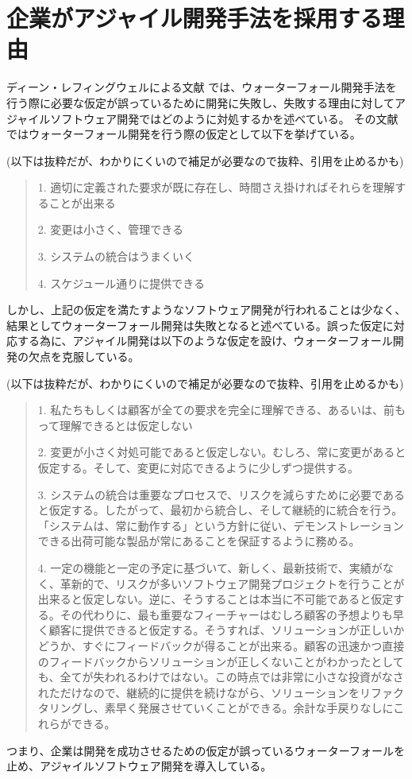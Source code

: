 \section{企業がアジャイル開発手法を採用する理由}

ディーン・レフィングウェルによる文献 \cite{leffingwell2010アジャイル開発の本質とスケールアップ}では、ウォーターフォール開発手法を行う際に必要な仮定が誤っているために開発に失敗し、失敗する理由に対してアジャイルソフトウェア開発ではどのように対処するかを述べている。
その文献ではウォーターフォール開発を行う際の仮定として以下を挙げている。

(以下は抜粋だが、わかりにくいので補足が必要なので抜粋、引用を止めるかも)

\begin{quote}
  1. 適切に定義された要求が既に存在し、時間さえ掛ければそれらを理解することが出来る

  2. 変更は小さく、管理できる

  3. システムの統合はうまくいく

  4. スケジュール通りに提供できる
\end{quote}

しかし、上記の仮定を満たすようなソフトウェア開発が行われることは少なく、結果としてウォーターフォール開発は失敗となると述べている。誤った仮定に対応する為に、アジャイル開発は以下のような仮定を設け、ウォーターフォール開発の欠点を克服している。

(以下は抜粋だが、わかりにくいので補足が必要なので抜粋、引用を止めるかも)

\begin{quote}
  1. 私たちもしくは顧客が全ての要求を完全に理解できる、あるいは、前もって理解できるとは仮定しない

  2. 変更が小さく対処可能であると仮定しない。むしろ、常に変更があると仮定する。そして、変更に対応できるように少しずつ提供する。

  3. システムの統合は重要なプロセスで、リスクを減らすために必要であると仮定する。したがって、最初から統合し、そして継続的に統合を行う。「システムは、常に動作する」という方針に従い、デモンストレーションできる出荷可能な製品が常にあることを保証するように務める。

  4. 一定の機能と一定の予定に基づいて、新しく、最新技術で、実績がなく、革新的で、リスクが多いソフトウェア開発プロジェクトを行うことが出来ると仮定しない。逆に、そうすることは本当に不可能であると仮定する。その代わりに、最も重要なフィーチャーはむしろ顧客の予想よりも早く顧客に提供できると仮定する。そうすれば、ソリューションが正しいかどうか、すぐにフィードバックが得ることが出来る。顧客の迅速かつ直接のフィードバックからソリューションが正しくないことがわかったとしても、全てが失われるわけではない。この時点では非常に小さな投資がなされただけなので、継続的に提供を続けながら、ソリューションをリファクタリングし、素早く発展させていくことができる。余計な手戻りなしにこれらができる。

\end{quote}

つまり、企業は開発を成功させるための仮定が誤っているウォーターフォールを止め、アジャイルソフトウェア開発を導入している。
